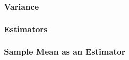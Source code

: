 \documentclass[handout]{beamer}
\newcommand{\blue}[1]{\textcolor{blue2}{#1}}
\newcommand{\xbar}{\overline{x}}
\newcommand{\E}{\mathbb{E}}
\newcommand{\Var}{\mbox{Var}}
\begin{document}
\begin{frame}
\frametitle{Variance}
%
%
%

\end{frame}


\begin{frame}
\frametitle{Estimators}

%
%

\end{frame}


\begin{frame}
\frametitle{Sample Mean as an Estimator}

%
%
%
%
\end{frame}
\end{document}
